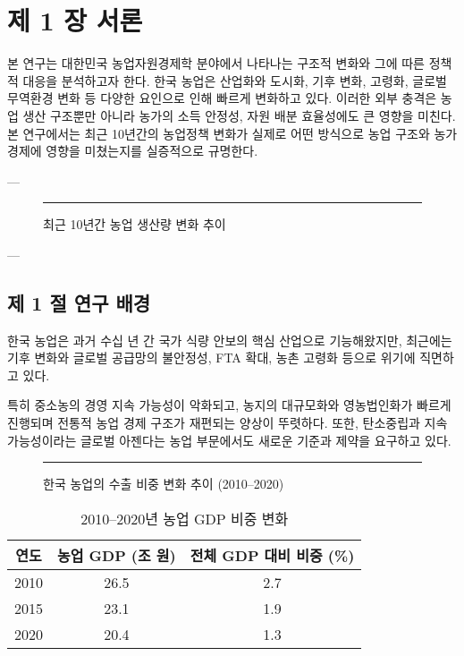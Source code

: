 \chapter*{제 1 장 서론}\label{chap:chapter1}



본 연구는 대한민국 농업자원경제학 분야에서 나타나는 구조적 변화와 그에 따른 정책적 대응을 분석하고자 한다.  
한국 농업은 산업화와 도시화, 기후 변화, 고령화, 글로벌 무역환경 변화 등 다양한 요인으로 인해 빠르게 변화하고 있다.  
이러한 외부 충격은 농업 생산 구조뿐만 아니라 농가의 소득 안정성, 자원 배분 효율성에도 큰 영향을 미친다.  
본 연구에서는 최근 10년간의 농업정책 변화가 실제로 어떤 방식으로 농업 구조와 농가 경제에 영향을 미쳤는지를 실증적으로 규명한다.

---

\begin{figure}[htbp]
  \centering
  \rule{0.7\linewidth}{5cm} %
  \caption{최근 10년간 농업 생산량 변화 추이}\label{fig:chapter1_1}
\end{figure}

---

\section{제 1 절 연구 배경}\label{sec:chapter1_1}

한국 농업은 과거 수십 년 간 국가 식량 안보의 핵심 산업으로 기능해왔지만,  
최근에는 기후 변화와 글로벌 공급망의 불안정성, FTA 확대, 농촌 고령화 등으로 위기에 직면하고 있다.  

특히 중소농의 경영 지속 가능성이 악화되고, 농지의 대규모화와 영농법인화가 빠르게 진행되며  
전통적 농업 경제 구조가 재편되는 양상이 뚜렷하다. 또한, 탄소중립과 지속가능성이라는 글로벌 아젠다는  
농업 부문에서도 새로운 기준과 제약을 요구하고 있다.

\begin{figure}[htbp]
  \centering
  \rule{0.65\linewidth}{5cm}
  \caption{한국 농업의 수출 비중 변화 추이 (2010–2020)}\label{fig:chapter1_2}
\end{figure}

\begin{table}[htbp]
  \centering
  \begin{tabular}{|c|c|c|}
    \hline
    연도 & 농업 GDP (조 원) & 전체 GDP 대비 비중 (\%) \\
    \hline
    2010 & 26.5 & 2.7 \\
    2015 & 23.1 & 1.9 \\
    2020 & 20.4 & 1.3 \\
    \hline
  \end{tabular}
  \caption{2010–2020년 농업 GDP 비중 변화}\label{tab:chapter1_1}
\end{table}



